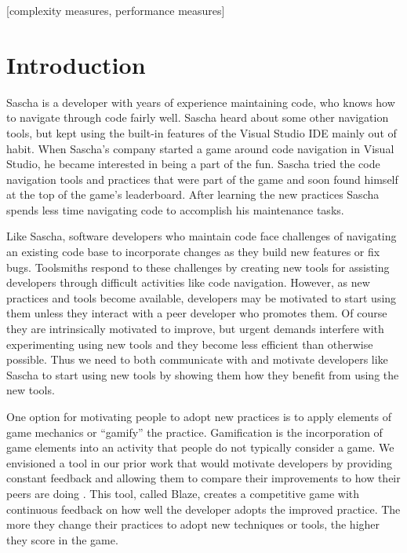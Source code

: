 \documentclass{sig-alternate}
\begin{document}
[complexity measures, performance measures]



\section{Introduction}

Sascha is a developer with years of experience maintaining code, who knows how to navigate through code fairly well.  Sascha heard about some other navigation tools, but kept using the built-in features of the Visual Studio IDE mainly out of habit.  When Sascha's company started a game around code navigation in Visual Studio, he became interested in being a part of the fun.  Sascha tried the code navigation tools and practices that were part of the game and soon found himself at the top of the game's leaderboard.  After learning the new practices Sascha spends less time navigating code to accomplish his maintenance tasks.

Like Sascha, software developers who maintain code face challenges of navigating an existing code base to incorporate changes as they build new features or fix bugs.  Toolsmiths respond to these challenges by creating new tools for assisting developers through difficult activities like code navigation.  However, as new practices and tools become available, developers may be motivated to start using them unless they interact with a peer developer who promotes them\cite{wbsnipes:Hill2011Peer}.    Of course they are intrinsically motivated to improve, but urgent demands interfere with experimenting using new tools and they become less efficient than otherwise possible.  Thus we need to both communicate with and motivate developers like Sascha to start using new tools by showing them how they benefit from using the new tools.  

One option for motivating people to adopt new practices is to apply elements of game mechanics or ``gamify'' the practice. Gamification is the incorporation of game elements into an activity that people do not typically consider a game\cite{2013Oxford}.  We envisioned a tool in our prior work that would motivate developers by providing constant feedback and allowing them to compare their improvements to how their peers are doing  \cite{Snipes2013Towards}.  This tool, called Blaze, creates a competitive game with continuous feedback on how well the developer adopts the improved practice.  The more they change their practices to adopt new techniques or tools, the higher they score in the game. 
\end{document}
